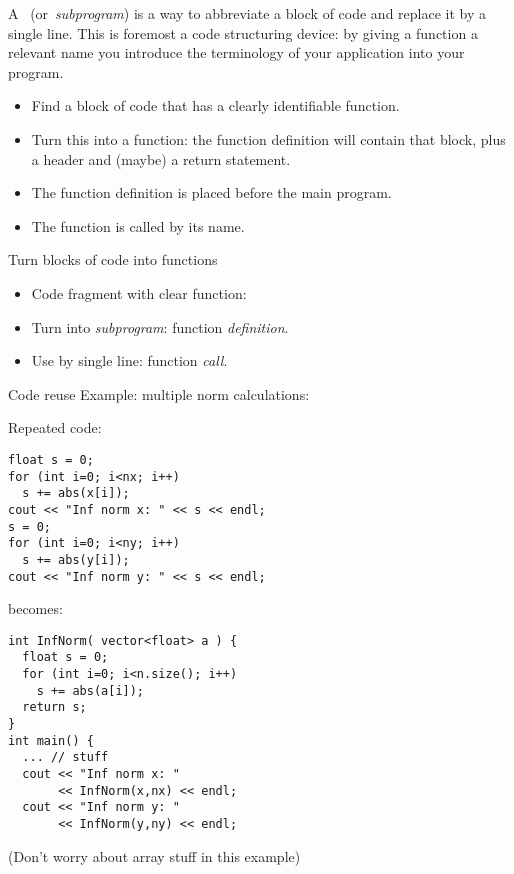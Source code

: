 
A~
(or~\emph{subprogram}) is a way to
abbreviate a block of code and replace it by a single line.
This is foremost a code structuring device: by giving a function a
relevant name you introduce the terminology of your application into
your program.

\begin{itemize}
\item Find a block of code that has a clearly identifiable function.
\item Turn this into a function: the function definition will contain
  that block, plus a header and (maybe) a return statement.
\item The function definition is placed before the main program.
\item The function is called by its name.
\end{itemize}

\begin{slide}{Turn blocks of code into functions}
  \label{sl:function-intro}
  \begin{itemize}
  \item Code fragment with clear function:
  \item Turn into \emph{subprogram}: function \emph{definition}.
  \item Use by single line: function \emph{call}.
  \end{itemize}
\end{slide}

\begin{block}{Code reuse}
  \label{sl:function-reuse}
Example: multiple norm calculations:
  \begin{multicols}{2}
    \small
    Repeated code:
\begin{verbatim}
float s = 0;
for (int i=0; i<nx; i++)
  s += abs(x[i]);
cout << "Inf norm x: " << s << endl;
s = 0;
for (int i=0; i<ny; i++)
  s += abs(y[i]);
cout << "Inf norm y: " << s << endl;
\end{verbatim}
\vfill\columnbreak
becomes:
\begin{verbatim}
int InfNorm( vector<float> a ) {
  float s = 0;
  for (int i=0; i<n.size(); i++)
    s += abs(a[i]);
  return s;
}
int main() {
  ... // stuff
  cout << "Inf norm x: "
       << InfNorm(x,nx) << endl;
  cout << "Inf norm y: " 
       << InfNorm(y,ny) << endl;
\end{verbatim}
  \end{multicols}
  (Don't worry about array stuff in this example)
\end{block}

